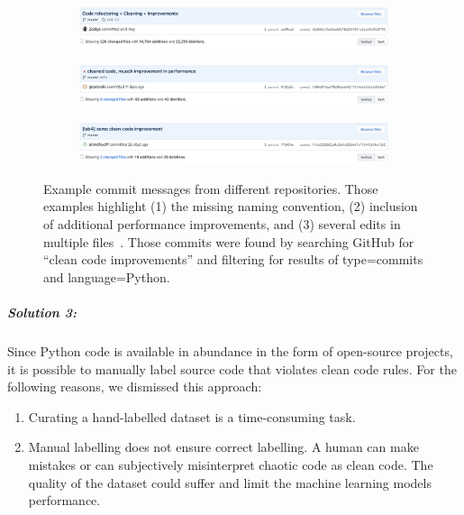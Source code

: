 \begin{figure}
    \begin{subfigure}{\textwidth}
        \includegraphics[width=1\linewidth]{img/ML/commit_messages/screen_1.png}
    \end{subfigure}
    \begin{subfigure}{\textwidth}
        \includegraphics[width=1\linewidth]{img/ML/commit_messages/screen_2.png}
    \end{subfigure}
    \begin{subfigure}{\textwidth}
        \includegraphics[width=1\linewidth]{img/ML/commit_messages/screen_3.png}
    \end{subfigure}
    \caption{Example commit messages from different repositories. Those examples highlight (1) the missing naming convention, (2) inclusion of additional performance improvements, and (3) several edits in multiple files~\cite{pendenque_code_2020, baranski_cleaned_2020, timofeev_lab4_2020}. Those commits were found by searching GitHub for \enquote{clean code improvements} and filtering for results of type=commits and language=Python. }
    \label{fig:commit_messages}
\end{figure}


\subparagraph{Solution 3:}
Since Python code is available in abundance in the form of open-source projects, it is possible to manually label source code that violates clean code rules. 
For the following reasons, we dismissed this approach:
\begin{enumerate}
    \item Curating a hand-labelled dataset is a time-consuming task. 
    \item Manual labelling does not ensure correct labelling. A human can make mistakes or can subjectively misinterpret chaotic code as clean code. The quality of the dataset could suffer and limit the machine learning models performance.
\end{enumerate}

